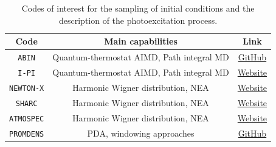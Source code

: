 \documentclass[9pt,bestpractices]{livecoms}
\begin{document}
\begin{table}[h!]
    \centering
    \begin{tabular}{|c|c|c|}
    \hline 
    \textbf{Code}  & \textbf{Main capabilities} & \textbf{Link} \\ 
    \hline
      \texttt{ABIN}   & Quantum-thermostat AIMD, Path integral MD & \href{https://github.com/PHOTOX/ABIN}{GitHub} \\
        \texttt{I-PI}   & Quantum-thermostat AIMD, Path integral MD & \href{https://ipi-code.org}{Website} \\
      \texttt{NEWTON-X} & Harmonic Wigner distribution, NEA  & \href{https://newtonx.org}{Website} \\
      \texttt{SHARC}   & Harmonic Wigner distribution, NEA & \href{https://sharc-md.org}{Website}\\
    \texttt{ATMOSPEC}   & Harmonic Wigner distribution, NEA & \href{https://github.com/ispg-group/aiidalab-ispg}{Website}\\
    \texttt{PROMDENS}   & PDA, windowing approaches & \href{https://github.com/PHOTOX/promdens}{GitHub}\\
    \hline
    \end{tabular}
    \caption{Codes of interest for the sampling of initial conditions and the description of the photoexcitation process.}
    \label{tab:IC}
\end{table}
\end{document}
